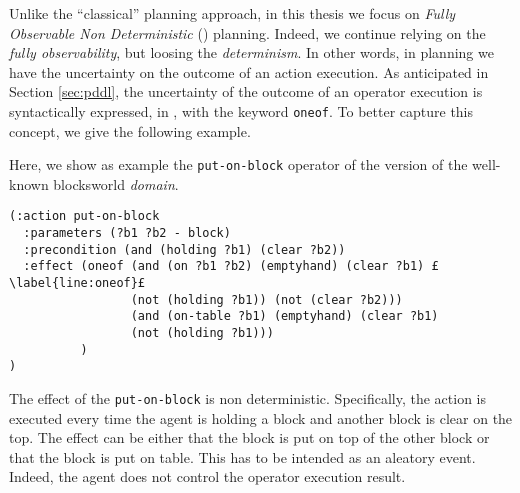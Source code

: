 Unlike the ``classical'' planning approach, in this thesis we focus on \textit{Fully Observable Non Deterministic} (\FOND) planning. Indeed, we continue relying on the \textit{fully observability}, but loosing the \textit{determinism}. In other words, in \FOND planning we have the uncertainty on the outcome of an action execution. As anticipated in Section \ref{sec:pddl}, the uncertainty of the outcome of an operator execution is syntactically expressed, in \PDDL, with the keyword \texttt{oneof}. To better capture this concept, we give the following example.

\begin{example}
Here, we show as example the \texttt{put-on-block} operator of the \FOND version of the well-known blocksworld \PDDL \textit{domain}.
\begin{lstlisting}[language=PDDL, escapechar=£]
(:action put-on-block
  :parameters (?b1 ?b2 - block)
  :precondition (and (holding ?b1) (clear ?b2))
  :effect (oneof (and (on ?b1 ?b2) (emptyhand) (clear ?b1) £\label{line:oneof}£
                 (not (holding ?b1)) (not (clear ?b2)))
                 (and (on-table ?b1) (emptyhand) (clear ?b1) 
                 (not (holding ?b1)))
          )
)
\end{lstlisting}
The effect of the \texttt{put-on-block} is non deterministic. Specifically, the action is executed every time the agent is holding a block and another block is clear on the top. The effect can be either that the block is put on top of the other block or that the block is put on table. This has to be intended as an aleatory event. Indeed, the agent does not control the operator execution result.
\end{example}

